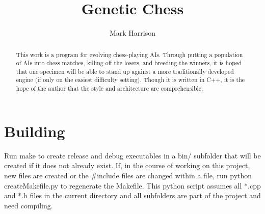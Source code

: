 \documentclass[letter]{article}
\title{Genetic Chess}
\author{Mark Harrison}
\newcommand{\cpp}{C{\nobreak +}{\nobreak +}}
\newcommand{\code}[1]{#1}
\renewcommand\_{\textunderscore\allowbreak}
\begin{document}
\maketitle

\begin{abstract}
This work is a program for evolving chess-playing AIs.  Through putting a population of AIs into chess matches, killing off the losers, and breeding the winners, it is hoped that one specimen will be able to stand up against a more traditionally developed engine (if only on the easiest difficulty setting). Though it is written in \cpp{}, it is the hope of the author that the style and architecture are comprehensible.
\end{abstract}

\tableofcontents{}


\section{Building}
Run \code{make} to create release and debug executables in a \code{bin/} subfolder that will be created if it does not already exist. If, in the course of working on this project, new files are created or the \code{\#include} files are changed within a file, run \code{python create\_Makefile.py} to regenerate the Makefile. This python script assumes all \code{*.cpp} and \code{*.h} files in the current directory and all subfolders are part of the project and need compiling.
\end{document}
